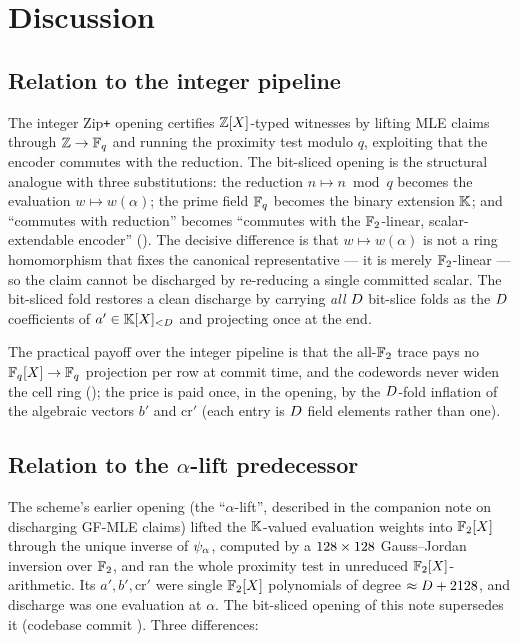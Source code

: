 \section{Discussion}
\label{sec:discussion}

\subsection{Relation to the integer pipeline}

The integer Zip\texttt{+} opening certifies $\mathbb{Z}[X]$-typed witnesses by
lifting MLE claims through $\mathbb{Z} \to \mathbb{F}_q$ and running the proximity test
modulo $q$, exploiting that the encoder commutes with the reduction. The
bit-sliced opening is the structural analogue with three substitutions:
the reduction $n \mapsto n\bmod q$ becomes the evaluation
$w \mapsto w(\alpha)$; the prime field $\mathbb{F}_q$ becomes the binary
extension $\mathbb{K}$; and ``commutes with reduction'' becomes ``commutes with
the $\mathbb{F}_2$-linear, scalar-extendable encoder'' ().
The decisive difference is that $w \mapsto w(\alpha)$ is not a ring
homomorphism that fixes the canonical representative --- it is merely
$\mathbb{F}_2$-linear --- so the claim cannot be discharged by re-reducing a
single committed scalar. The bit-sliced fold restores a clean discharge
by carrying \emph{all} $D$ bit-slice folds as the $D$
coefficients of $a' \in \mathbb{K}[X]_{<D}$ and projecting once at the end.

The practical payoff over the integer pipeline is that the all-$\mathbb{F}_2$
trace pays no $\mathbb{F}_q[X]\to\mathbb{F}_q$ projection per row at commit time, and the
codewords never widen the cell ring (); the price is
paid once, in the opening, by the $D$-fold inflation of the algebraic
vectors $b'$ and $\mathrm{cr}'$ (each entry is $D$ field elements
rather than one).

\subsection{Relation to the $\alpha$-lift predecessor}

The scheme's earlier opening (the ``$\alpha$-lift'', described in the
companion note on discharging GF-MLE claims) lifted the $\mathbb{K}$-valued
evaluation weights into $\mathbb{F}_2[X]$ through the unique inverse of $\psi_{\alpha}$,
computed by a $128\times128$ Gauss--Jordan inversion over $\mathbb{F}_2$,
and ran the whole proximity test in unreduced $\mathbb{F}_2[X]$-arithmetic. Its
$a',b',\mathrm{cr}'$ were single $\mathbb{F}_2[X]$ polynomials of degree
$\approx D + 2128$, and discharge was one evaluation at $\alpha$.
The bit-sliced opening of this note supersedes it (codebase commit
). Three differences:

